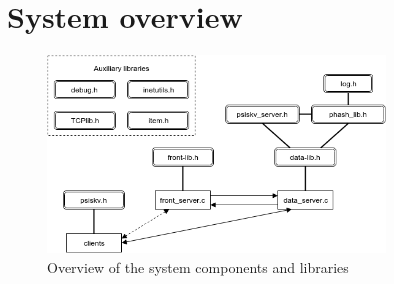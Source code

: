\documentclass[12pt]{article} %
\begin{document}

\section{System overview}
\label{sec:Systemoverview}



\begin{figure}[H]
\centering
\includegraphics[width=0.8\textwidth]{./Pictures/KV_SystemOverview.png}
\caption{Overview of the system components and libraries}\label{fig:KVSyst}
\end{figure}
\end{document}
